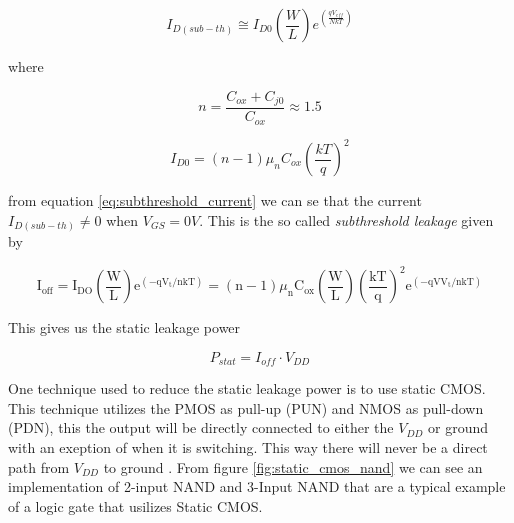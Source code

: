 \begin{equation}
    I_{D(sub-th)}\cong I_{D0} \left(\frac{W}{L}\right) e^{(\frac{qV_{eff}}{NkT})}
    \label{eq:subthreshold_current}
\end{equation}

where

\begin{equation}
    n=\frac{C_{ox}+C_{j0}}{C_{ox}}\approx 1.5
    \label{eq:n}
\end{equation}

\begin{equation}
    I_{D0}=(n-1)\mu_nC_{ox}\left(\frac{kT}{q}\right)^2
\end{equation}

from equation \ref{eq:subthreshold_current} we can se that the current $I_{D(sub-th)}\neq 0$ when $V_{GS}=0V$. This is the so called \textit{subthreshold leakage} given by 

\begin{equation}
    \mathrm{I}_{\mathrm{off}}=\mathrm{I}_{\mathrm{DO}}\left(\frac{\mathrm{W}}{\mathrm{L}}\right) \mathrm{e}^{\left(-\mathrm{q} \mathrm{V}_{\mathrm{t}} / \mathrm{nkT}\right)}=(\mathrm{n}-1) \mu_{\mathrm{n}} \mathrm{C}_{\mathrm{ox}}\left(\frac{\mathrm{W}}{\mathrm{L}}\right)\left(\frac{\mathrm{kT}}{\mathrm{q}}\right)^2 \mathrm{e}^{\left(-\mathrm{qV} \mathrm{V}_{\mathrm{t}} / \mathrm{nkT}\right)}
    \label{eq:subthreshold_leakage}
\end{equation}

This gives us the static leakage power \cite{departmentofelectronicsystemsntnu_2023_dc}

\begin{equation}
    P_{stat}=I_{off}\cdot V_{DD}
\end{equation}

One technique used to reduce the static leakage power is to use static CMOS. This technique utilizes the PMOS as pull-up (PUN) and NMOS as pull-down (PDN), this the output will be directly connected to either the $V_{DD}$ or ground with an exeption of when it is switching. This way there will never be a direct path from $V_{DD}$ to ground \cite{a2018}. From figure \ref{fig:static_cmos_nand} we can see an implementation of 2-input NAND and 3-Input NAND that are a typical example of a logic gate that usilizes Static CMOS.

